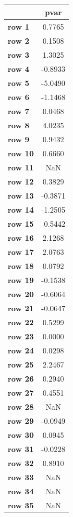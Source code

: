 \begin{tiny}\begin{tabular}{|l|c|}
\hline
&\textbf{pvar}\\\hline
\textbf{row 1}&0.7765\\\hline
\textbf{row 2}&0.1508\\\hline
\textbf{row 3}&1.3025\\\hline
\textbf{row 4}&-0.8933\\\hline
\textbf{row 5}&-5.0490\\\hline
\textbf{row 6}&-1.1468\\\hline
\textbf{row 7}&0.0468\\\hline
\textbf{row 8}&4.0235\\\hline
\textbf{row 9}&0.9432\\\hline
\textbf{row 10}&0.6660\\\hline
\textbf{row 11}&NaN\\\hline
\textbf{row 12}&0.3829\\\hline
\textbf{row 13}&-0.3871\\\hline
\textbf{row 14}&-1.2505\\\hline
\textbf{row 15}&-0.5442\\\hline
\textbf{row 16}&2.1268\\\hline
\textbf{row 17}&2.0763\\\hline
\textbf{row 18}&0.0792\\\hline
\textbf{row 19}&-0.1538\\\hline
\textbf{row 20}&-0.6064\\\hline
\textbf{row 21}&-0.0647\\\hline
\textbf{row 22}&0.5299\\\hline
\textbf{row 23}&0.0000\\\hline
\textbf{row 24}&0.0298\\\hline
\textbf{row 25}&2.2467\\\hline
\textbf{row 26}&0.2940\\\hline
\textbf{row 27}&0.4551\\\hline
\textbf{row 28}&NaN\\\hline
\textbf{row 29}&-0.0949\\\hline
\textbf{row 30}&0.0945\\\hline
\textbf{row 31}&-0.0228\\\hline
\textbf{row 32}&0.8910\\\hline
\textbf{row 33}&NaN\\\hline
\textbf{row 34}&NaN\\\hline
\textbf{row 35}&NaN\\\hline

\end{tabular}
\end{tiny}
